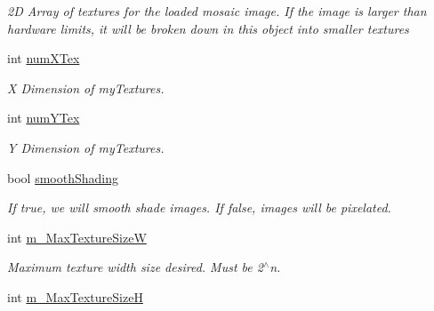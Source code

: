 \begin{DoxyCompactItemize}
\begin{DoxyCompactList}\small\item\em 2D Array of textures for the loaded mosaic image. If the image is larger than hardware limits, it will be broken down in this object into smaller textures \end{DoxyCompactList}\item 
\hypertarget{class_geomap3_d_a6d080def58991b1a88da8177c065e603}{
int \hyperlink{class_geomap3_d_a6d080def58991b1a88da8177c065e603}{numXTex}}
\label{class_geomap3_d_a6d080def58991b1a88da8177c065e603}

\begin{DoxyCompactList}\small\item\em X Dimension of myTextures. \end{DoxyCompactList}\item 
\hypertarget{class_geomap3_d_add0ee5be74c4264bce7004ee910423dd}{
int \hyperlink{class_geomap3_d_add0ee5be74c4264bce7004ee910423dd}{numYTex}}
\label{class_geomap3_d_add0ee5be74c4264bce7004ee910423dd}

\begin{DoxyCompactList}\small\item\em Y Dimension of myTextures. \end{DoxyCompactList}\item 
\hypertarget{class_geomap3_d_a86b8e301e481c8dabc1feece38f89b0c}{
bool \hyperlink{class_geomap3_d_a86b8e301e481c8dabc1feece38f89b0c}{smoothShading}}
\label{class_geomap3_d_a86b8e301e481c8dabc1feece38f89b0c}

\begin{DoxyCompactList}\small\item\em If true, we will smooth shade images. If false, images will be pixelated. \end{DoxyCompactList}\item 
\hypertarget{class_geomap3_d_a530e7c3e47a9aa994619d0b90a69bc63}{
int \hyperlink{class_geomap3_d_a530e7c3e47a9aa994619d0b90a69bc63}{m\_\-MaxTextureSizeW}}
\label{class_geomap3_d_a530e7c3e47a9aa994619d0b90a69bc63}

\begin{DoxyCompactList}\small\item\em Maximum texture width size desired. Must be 2$^\wedge$n. \end{DoxyCompactList}\item 
\hypertarget{class_geomap3_d_ae2b1965874c89cc4b543b39742f4b5d5}{
int \hyperlink{class_geomap3_d_ae2b1965874c89cc4b543b39742f4b5d5}{m\_\-MaxTextureSizeH}}
\label{class_geomap3_d_ae2b1965874c89cc4b543b39742f4b5d5}


\end{DoxyCompactItemize}
